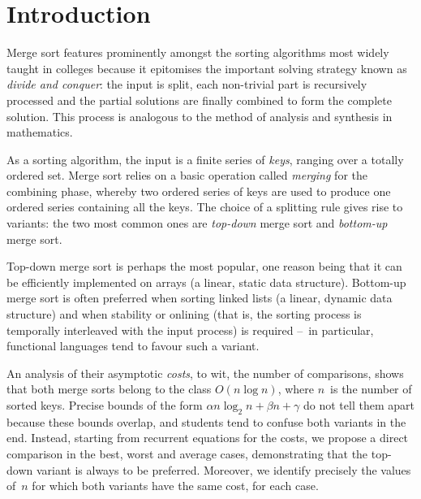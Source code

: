 \section{Introduction}

Merge sort features prominently amongst the sorting algorithms most
widely taught in colleges because it epitomises the important solving
strategy known as \emph{divide and conquer}: the input is split, each
non-trivial part is recursively processed and the partial solutions
are finally combined to form the complete solution. This process is
analogous to the method of analysis and synthesis in mathematics.

As a sorting algorithm, the input is a finite series of \emph{keys},
ranging over a totally ordered set. Merge sort relies on a basic
operation called \emph{merging} for the combining phase, whereby two
ordered series of keys are used to produce one ordered series
containing all the keys. The choice of a splitting rule gives rise to
variants: the two most common ones are \emph{top-down} merge sort and
\emph{bottom-up} merge sort.

Top-down merge sort is perhaps the most popular, one reason being that
it can be efficiently implemented on arrays (a linear, static data
structure). Bottom-up merge sort is often preferred when sorting
linked lists (a linear, dynamic data structure) and when stability or
onlining (that is, the sorting process is temporally interleaved with
the input process) is required --~in particular, functional languages
tend to favour such a variant.

An analysis of their asymptotic \emph{costs}, to wit, the number of
comparisons, shows that both merge sorts belong to the class
\(O(n\log{n})\), where \(n\)~is the number of sorted keys. Precise
bounds of the form $\alpha n\log_2 n + \beta n + \gamma$ do not tell
them apart because these bounds overlap, and students tend to confuse
both variants in the end. Instead, starting from recurrent equations
for the costs, we propose a direct comparison in the best, worst and
average cases, demonstrating that the top-down variant is always to be
preferred. Moreover, we identify precisely the values of~\(n\) for
which both variants have the same cost, for each case.
